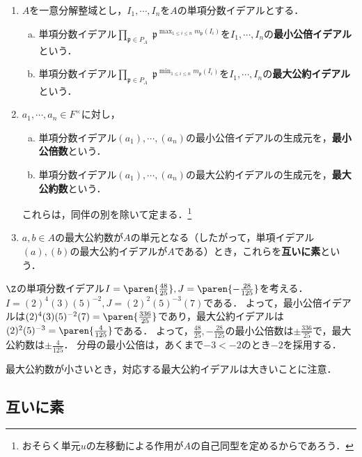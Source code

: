 \documentclass[uplatex,dvipdfmx]{jsreport}
\renewcommand{\p}{\mathfrak{p}}
\begin{document}
\begin{definition}\mbox{}\label{def-gcd-lcm-in-UFD}
    \begin{enumerate}
        \item $A$を一意分解整域とし，$I_1,\cdots,I_n$を$A$の単項分数イデアルとする．
        \begin{enumerate}[(a)]
            \item 単項分数イデアル$\prod_{\p\in P_A}\;\p^{\max_{1\le i\le n}m_\p(I_i)}$を$I_1,\cdots,I_n$の\textbf{最小公倍イデアル}という．
            \item 単項分数イデアル$\prod_{\p\in P_A}\;\p^{\min_{1\le i\le n}m_\p(I_i)}$を$I_1,\cdots,I_n$の\textbf{最大公約イデアル}という．
        \end{enumerate}
        \item $a_1,\cdots,a_n\in F^\times$に対し，
        \begin{enumerate}[(a)]
            \item 単項分数イデアル$(a_1),\cdots,(a_n)$の最小公倍イデアルの生成元を，\textbf{最小公倍数}という．
            \item 単項分数イデアル$(a_1),\cdots,(a_n)$の最大公約イデアルの生成元を，\textbf{最大公約数}という．
        \end{enumerate}
        これらは，同伴の別を除いて定まる．\footnote{おそらく単元$u$の左移動による作用が$A$の自己同型を定めるからであろう．}
        \item $a,b\in A$の最大公約数が$A$の単元となる（したがって，単項イデアル$(a),(b)$の最大公約イデアルが$A$である）とき，これらを\textbf{互いに素}という．
    \end{enumerate}
\end{definition}
\begin{example}[整数環での例]
    $\Z$の単項分数イデアル$I=\paren{\frac{48}{25}},J=\paren{-\frac{28}{125}}$を考える．$I=(2)^4(3)(5)^{-2},J=(2)^{2}(5)^{-3}(7)$である．
    よって，最小公倍イデアルは$(2)^4(3)(5)^{-2}(7)=\paren{\frac{336}{25}}$であり，最大公約イデアルは$(2)^2(5)^{-3}=\paren{\frac{4}{125}}$である．
    よって，$\frac{48}{25},-\frac{28}{125}$の最小公倍数は$\pm\frac{336}{25}$で，最大公約数は$\pm\frac{4}{125}$．
    分母の最小公倍は，あくまで$-3<-2$のとき$-2$を採用する．
\end{example}
\begin{remarks}
    最大公約数が小さいとき，対応する最大公約イデアルは大きいことに注意．
\end{remarks}

\subsection{互いに素}
\end{document}
